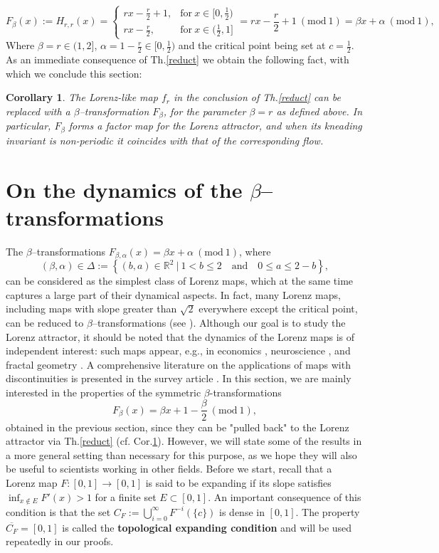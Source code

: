 \documentclass[10pt,reqno]{amsart}
\theoremstyle{plain}
\theoremstyle{assumption}
\theoremstyle{notation}
\theoremstyle{claim}
\theoremstyle{conj}
\theoremstyle{theorem}
\theoremstyle{proposition}
\theoremstyle{corollary}
\newtheorem{corollary}{Corollary}[section]
\newcommand{\Mod}[1]{\ (\mathrm{mod}\ #1)}
\begin{document}
$$
F_{\beta}(x):=H_{r,r}(x)=
\begin{cases}
			r x-\frac{r}{2}+1, & \text{for}\ x\in[0,\frac{1}{2})\\
            r x-\frac{r}{2}, & \text{for}\ x\in(\frac{1}{2},1]
		 \end{cases}=rx-\frac{r}{2}+1\Mod{1}=\beta x+\alpha\Mod{1},
$$
Where $\beta=r\in(1,2]$, $\alpha=1-\frac{r}{2}\in[0,\frac{1}{2})$ and the critical point being set at $c=\frac{1}{2}$. As an immediate consequence of Th.\ref{reduct} we obtain the following fact, with which we conclude this section:
\begin{corollary}
    \label{reduct2}
    The Lorenz-like map $f_r$ in the conclusion of Th.\ref{reduct} can be replaced with a $\beta$--transformation $F_\beta$, for the parameter $\beta=r$ as defined above. In particular, $F_\beta$ forms a factor map for the Lorenz attractor, and when its kneading invariant is non-periodic it coincides with that of the corresponding flow.
\end{corollary}

\section{On the dynamics of the $\beta$--transformations}
\label{onesect}

The $\beta$--transformations $F_{\beta,\alpha}(x)=\beta x+\alpha \Mod{1}$, where
$$
(\beta,\alpha)\in\Delta:=\left\lbrace (b,a)\in\mathbb{R}^2\:|\: 1<b\leq2\quad\text{and}\quad 0\leq a\leq 2-b\right\rbrace,
$$
can be considered as the simplest class of Lorenz maps, which at the same time captures a large part of their dynamical aspects. In fact, many Lorenz maps, including maps with slope greater than $\sqrt{2}$ everywhere except the critical point, can be reduced to $\beta$--transformations (see \cite{Parry,Glen,DiCui}). Although our goal is to study the Lorenz attractor, it should be noted that the dynamics of the Lorenz maps is of independent interest: such maps appear, e.g., in economics \cite{Eco,Eco2}, neuroscience \cite{BLS,BNPSR}, and fractal geometry \cite{BarHV}. A comprehensive literature on the applications of maps with discontinuities is presented in the survey article \cite{SIAMrev}. In this section, we are mainly interested in the properties of the symmetric $\beta$-transformations
\begin{equation}
\label{eq:family_maps}
F_{\beta}(x)=\beta x+1-\frac{\beta}{2}\Mod{1},    
\end{equation}
obtained in the previous section, since they can be "pulled back" to the Lorenz attractor via Th.\ref{reduct} (cf. Cor.\ref{reduct2}). However, we will state some of the results in a more general setting than necessary for this purpose, as we hope they will also be useful to scientists working in other fields. Before we start, recall that a Lorenz map $F\colon[0,1]\to[0,1]$ is said to be expanding if its slope satisfies $\inf_{x\not\in E} F'(x)>1$ for a finite set $E\subset[0,1]$. An important consequence of this condition is that the set $C_F:=\bigcup_{i=0}^{\infty}F^{-i}(\{c\})$ is dense in $[0,1]$. The property $\overline{C_F}=[0,1]$ is called the \textbf{topological expanding condition} and will be used repeatedly in our proofs.
\end{document}
